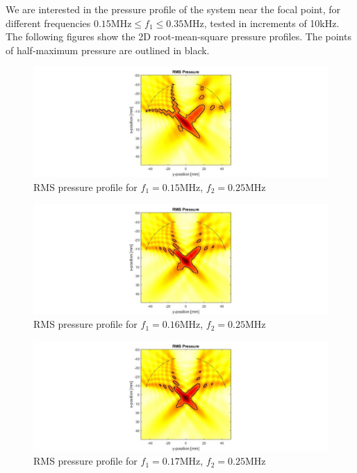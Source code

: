 \documentclass[10pt,a4paper]{article}
\begin{document}
We are interested in the pressure profile of the system near the focal point, for different frequencies $0.15 \text{MHz} \leq f_1 \leq 0.35 \text{MHz}$, tested in increments of 10kHz. The following figures show the 2D root-mean-square pressure profiles. The points of half-maximum pressure are outlined in black.

\begin{figure}[!h]
\hspace*{-5cm}                                                    
\includegraphics[scale=0.6]{f150kHz}
\caption{RMS pressure profile for $f_1 = 0.15$MHz, $f_2 = 0.25$MHz}
\end{figure}
\begin{figure}[!h]
\hspace*{-5cm}                                                    
\includegraphics[scale=0.6]{f160kHz}
\caption{RMS pressure profile for $f_1 = 0.16$MHz, $f_2 = 0.25$MHz}
\end{figure}
\begin{figure}[!h]
\hspace*{-5cm}                                                    
\includegraphics[scale=0.6]{f170kHz}
\caption{RMS pressure profile for $f_1 = 0.17$MHz, $f_2 = 0.25$MHz}
\end{figure}
\end{document}
